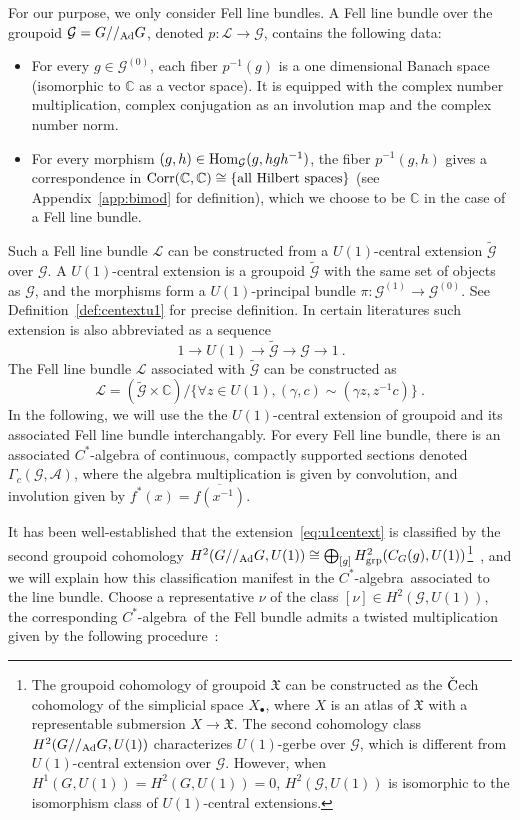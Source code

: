 \documentclass[a4paper,11pt]{article}
\newcommand{\be}{\begin{equation}}
\newcommand{\ee}{\end{equation}}
\def\bbC{\mathbb{C}}
\def\CG{\mathcal{G}}
\def\CL{\mathcal{L}}
\def\mfr{\mathfrak}
\def\calg{$C^*$-algebra\ }
\def\gmg{G//_{\rm Ad} G}
\begin{document}
For our purpose, we only consider Fell line bundles. A Fell line bundle over the groupoid $\CG = \gmg$, denoted $p:\CL \to \CG$, contains the following data:
\begin{itemize}
    \item For every $g\in \CG^{(0)}$, each fiber $p^{-1}(g)$ is a one dimensional Banach space (isomorphic to $\bbC$ as a vector space). It is equipped with the complex number multiplication, complex conjugation as an involution map and the complex number norm.
    \item For every morphism $(g,h)\in {\rm Hom}_\CG(g,hgh^{-1})$, the fiber $p^{-1}(g,h)$ gives a correspondence in ${\rm Corr}(\bbC,\bbC)\cong \{\text{all Hilbert spaces} \}$ (see Appendix~\ref{app:bimod} for definition), which we choose to be $\bbC$ in the case of a Fell line bundle.
\end{itemize}
Such a Fell line bundle $\CL$ can be constructed from a $U(1)$-central extension $\widetilde{\CG}$ over $\CG$. A $U(1)$-central extension is a groupoid $\widetilde{\CG}$ with the same set of objects as $\CG$, and the morphisms form a $U(1)$-principal bundle $\pi: \CG^{(1)}\to \CG^{(0)}$. See Definition~\ref{def:centextu1} for precise definition. In certain literatures such extension is also abbreviated as a sequence
\be~\label{eq:u1centext}  1 \rightarrow U(1) \rightarrow \widetilde{\CG} \rightarrow \CG \rightarrow 1 \ . \ee
The Fell line bundle $\CL$ associated with $\widetilde{\CG}$ can be constructed as 
\be\CL = (\widetilde{\CG}\times \bbC)/\{ \forall z\in U(1), (\gamma, c) \sim (\gamma z,z^{-1}c)  \} \ .\ee
In the following, we will use the the $U(1)$-central extension of groupoid and its associated Fell line bundle interchangably. For every Fell line bundle, there is an associated $C^*$-algebra of continuous, compactly supported sections denoted $\Gamma_c(\mathcal{G}, \mathcal{A})$, where the algebra multiplication is given by convolution, and involution given by $f^*(x) = \overline{f(x^{-1})}$.


It has been well-established that the extension~\eqref{eq:u1centext} is classified by the second groupoid cohomology $H^2(\gmg,U(1))\cong \bigoplus_{[g]}H^2_{\rm grp}(C_G(g),U(1))$\footnote{The groupoid cohomology of groupoid $\mfr{X}$ can be constructed as the $\check{\rm C}$ech cohomology of the simplicial space $X_\bullet$, where $X$ is an atlas of $\mfr{X}$ with a representable submersion $X\to \mfr{X}$. The second cohomology class $H^2(\gmg,U(1))$ characterizes $U(1)$-gerbe over $\CG$, which is different from $U(1)$-central extension over $\CG$. However, when $H^1(G,U(1)) = H^2(G,U(1))= 0$, $H^2(\CG,U(1))$ is isomorphic to the isomorphism class of $U(1)$-central extensions.}~\cite{Behrend:2008}, and we will explain how this classification manifest in the \calg associated to the line bundle.  Choose a representative $\nu$ of the class $[\nu]\in H^2(\CG,U(1))$, the corresponding \calg of the Fell bundle admits a twisted multiplication given by the following procedure~\cite{Kumjian:1998umx,Bhowmick:2018}:
\end{document}
